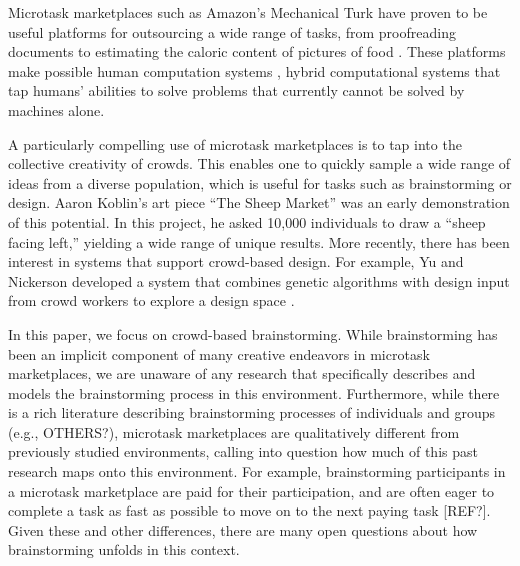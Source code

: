 
Microtask marketplaces such as Amazon's Mechanical Turk have proven to be useful platforms for outsourcing a wide range of tasks, from proofreading documents \cite{soylent} to estimating the caloric content of pictures of food \cite{platemate}.  These platforms make possible human computation systems \cite{quinn_2011}, hybrid computational systems that tap humans' abilities to solve problems that currently cannot be solved by machines alone.

A particularly compelling use of microtask marketplaces is to tap into the collective creativity of crowds. This enables one to quickly sample a wide range of ideas from a diverse population, which is useful for tasks such as brainstorming or design. Aaron Koblin's art piece ``The Sheep Market'' \cite{koblin_2009} was an early demonstration of this potential. In this project, he asked 10,000 individuals to draw a ``sheep facing left,'' yielding a wide range of unique results. More recently, there has been interest in systems that support crowd-based design. For example, Yu and Nickerson developed a system that combines genetic algorithms with design input from crowd workers to explore a design space \cite{yu_cooks_2011}. 

In this paper, we focus on crowd-based brainstorming. While brainstorming has been an implicit component of many creative endeavors in microtask marketplaces, we are unaware of any research that specifically describes and models the brainstorming process in this environment. Furthermore, while there is a rich literature describing brainstorming processes of individuals and groups (e.g., \cite{osborn_applied_1957, pinsonneault_electronic_1999, nijstad_how_2006} OTHERS?), microtask marketplaces are qualitatively different from previously studied environments, calling into question how much of this past research maps onto this environment. For example, brainstorming participants in a microtask marketplace are paid for their participation, and are often eager to complete a task as fast as possible to move on to the next paying task [REF?]. Given these and other differences, there are many open questions about how brainstorming unfolds in this context.

